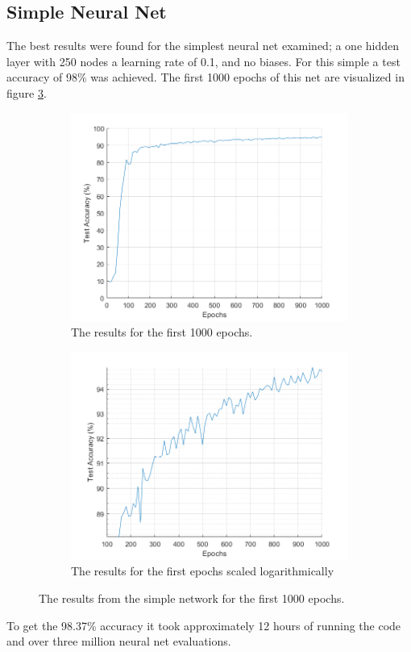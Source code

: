 \documentclass[12pt]{article}
\begin{document}
	\subsection{Simple Neural Net}
	The best results were found for the simplest neural net examined; a one hidden layer with 250 nodes a learning rate of 0.1, and no biases. For this simple a test accuracy of 98\% was achieved. The first 1000 epochs of this net are visualized in figure \ref{fig:250_all}.
	\begin{figure}
		\centering
		\begin{subfigure}{.5\textwidth}
			\centering
			\includegraphics[width=\linewidth]{250_results}
			\caption{The results for the first 1000 epochs.}
			\label{fig:250results}
		\end{subfigure}%
		\begin{subfigure}{.5\textwidth}
			\centering
			\includegraphics[width=\linewidth]{250_results_log}
			\caption{The results for the first epochs scaled logarithmically}
			\label{fig:250resultslog}
		\end{subfigure}
		\caption{The results from the simple network for the first 1000 epochs.}
		\label{fig:250_all}
	\end{figure}
	To get the 98.37\% accuracy it took approximately 12 hours of running the code and over three million neural net evaluations.
	
\end{document}
